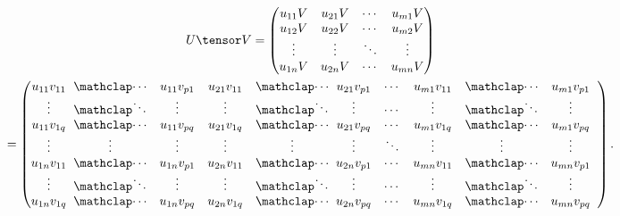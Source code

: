 \begin{definition}
  \begin{gather*}
    U \tensor V =
    \begin{pmatrix}
      u_{11}V & u_{21}V & \cdots & u_{m1}V \\
      u_{12}V & u_{22}V & \cdots & u_{m2}V \\
      \vdots & \vdots & \ddots & \vdots \\
      u_{1n}V & u_{2n}V & \cdots & u_{mn}V
    \end{pmatrix} \\ =
    \left(\begin{array}{@{}*{2}{c@{\;\;}ccc}cc@{\;\;}ccc@{}}
      u_{11}v_{11} & \icdots & u_{11}v_{p1} &
      u_{21}v_{11} & \icdots & u_{21}v_{p1} &
      \cdots &
      u_{m1}v_{11} & \icdots & u_{m1}v_{p1}
      \\
      \vdots & \iddots & \vdots &
      \vdots & \iddots & \vdots &
      \cdots &
      \vdots & \iddots & \vdots
      \\
      u_{11}v_{1q} & \icdots & u_{11}v_{pq} &
      u_{21}v_{1q} & \icdots & u_{21}v_{pq} &
      \cdots &
      u_{m1}v_{1q} & \icdots & u_{m1}v_{pq}
      \\
      \vdots & \vdots & \vdots &
      \vdots & \vdots & \vdots &
      \ddots &
      \vdots & \vdots & \vdots
      \\
      u_{1n}v_{11} & \icdots & u_{1n}v_{p1} &
      u_{2n}v_{11} & \icdots & u_{2n}v_{p1} &
      \cdots &
      u_{mn}v_{11} & \icdots & u_{mn}v_{p1}
      \\
      \vdots & \iddots & \vdots &
      \vdots & \iddots & \vdots &
      \cdots &
      \vdots & \iddots & \vdots
      \\
      u_{1n}v_{1q} & \icdots & u_{1n}v_{pq} &
      u_{2n}v_{1q} & \icdots & u_{2n}v_{pq} &
      \cdots &
      u_{mn}v_{1q} & \icdots & u_{mn}v_{pq}
    \end{array}\right).%
  \end{gather*}


\end{definition}
